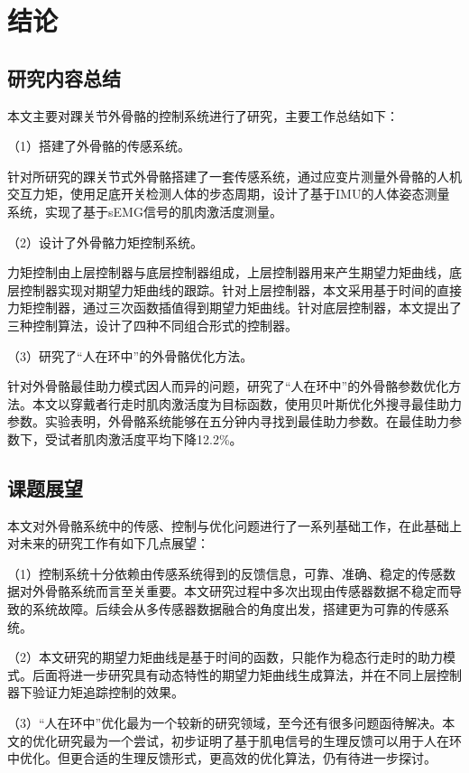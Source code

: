 \chapter{结论}
\section{研究内容总结}

本文主要对踝关节外骨骼的控制系统进行了研究，主要工作总结如下：

（1）搭建了外骨骼的传感系统。

针对所研究的踝关节式外骨骼搭建了一套传感系统，通过应变片测量外骨骼的人机交互力矩，使用足底开关检测人体的步态周期，设计了基于IMU的人体姿态测量系统，实现了基于sEMG信号的肌肉激活度测量。

（2）设计了外骨骼力矩控制系统。

力矩控制由上层控制器与底层控制器组成，上层控制器用来产生期望力矩曲线，底层控制器实现对期望力矩曲线的跟踪。针对上层控制器，本文采用基于时间的直接力矩控制器，通过三次函数插值得到期望力矩曲线。针对底层控制器，本文提出了三种控制算法，设计了四种不同组合形式的控制器。

（3）研究了“人在环中”的外骨骼优化方法。

针对外骨骼最佳助力模式因人而异的问题，研究了“人在环中”的外骨骼参数优化方法。本文以穿戴者行走时肌肉激活度为目标函数，使用贝叶斯优化外搜寻最佳助力参数。实验表明，外骨骼系统能够在五分钟内寻找到最佳助力参数。在最佳助力参数下，受试者肌肉激活度平均下降12.2\%。

\section{课题展望}

本文对外骨骼系统中的传感、控制与优化问题进行了一系列基础工作，在此基础上对未来的研究工作有如下几点展望：

（1）控制系统十分依赖由传感系统得到的反馈信息，可靠、准确、稳定的传感数据对外骨骼系统而言至关重要。本文研究过程中多次出现由传感器数据不稳定而导致的系统故障。后续会从多传感器数据融合的角度出发，搭建更为可靠的传感系统。

（2）本文研究的期望力矩曲线是基于时间的函数，只能作为稳态行走时的助力模式。后面将进一步研究具有动态特性的期望力矩曲线生成算法，并在不同上层控制器下验证力矩追踪控制的效果。

（3）“人在环中”优化最为一个较新的研究领域，至今还有很多问题函待解决。本文的优化研究最为一个尝试，初步证明了基于肌电信号的生理反馈可以用于人在环中优化。但更合适的生理反馈形式，更高效的优化算法，仍有待进一步探讨。